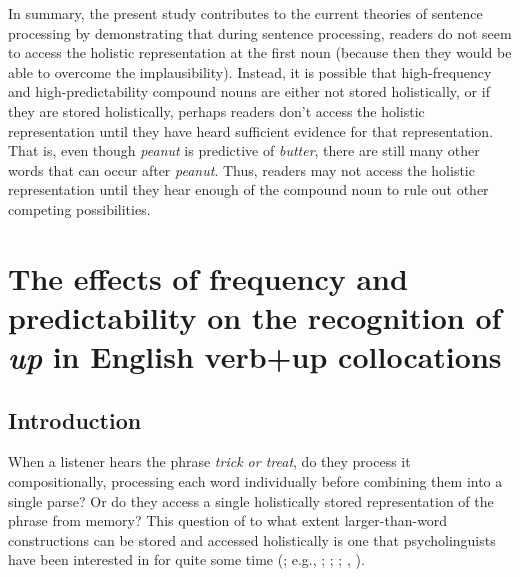 \documentclass[
  12pt,
  letterpaper,
]{scrreport}
\begin{document}
In summary, the present study contributes to the current theories of
sentence processing by demonstrating that during sentence processing,
readers do not seem to access the holistic representation at the first
noun (because then they would be able to overcome the implausibility).
Instead, it is possible that high-frequency and high-predictability
compound nouns are either not stored holistically, or if they are stored
holistically, perhaps readers don't access the holistic representation
until they have heard sufficient evidence for that representation. That
is, even though \emph{peanut} is predictive of \emph{butter}, there are
still many other words that can occur after \emph{peanut}. Thus, readers
may not access the holistic representation until they hear enough of the
compound noun to rule out other competing possibilities.


\chapter{\texorpdfstring{The effects of frequency and predictability on
the recognition of \emph{up} in English verb+up
collocations}{The effects of frequency and predictability on the recognition of up in English verb+up collocations}}\label{the-effects-of-frequency-and-predictability-on-the-recognition-of-up-in-english-verbup-collocations}

\section{Introduction}\label{introduction-2}

When a listener hears the phrase \emph{trick or treat}, do they process
it compositionally, processing each word individually before combining
them into a single parse? Or do they access a single holistically stored
representation of the phrase from memory? This question of to what
extent larger-than-word constructions can be stored and accessed
holistically is one that psycholinguists have been interested in for
quite some time (; e.g.,
;
; ;
,
).
\end{document}
